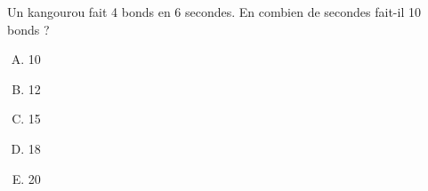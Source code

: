 Un kangourou fait 4 bonds en 6 secondes. En combien de secondes fait-il 10 bonds ?
\begin{multicols}{5}
  \begin{enumerate}[A)]
  \item 10
  \item 12
  \item 15
  \item 18
  \item 20
  \end{enumerate}
\end{multicols}
